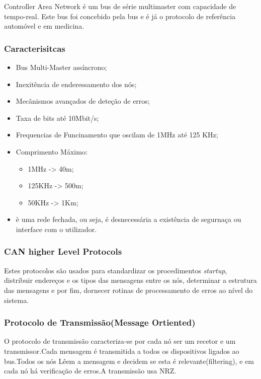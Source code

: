 \documentclass[10pt,a4paper]{paper}
\begin{document}
Controller Area Network é um bus de série multimaster com capacidade de tempo-real. Este bus foi concebido pela bus e é já o protocolo de referência automóvel e em medicina.

\subsubsection*{Caracterisitcas}
\begin{itemize}
 \item Bus Multi-Master assíncrono;
 \item Inexitência de enderessamento dos nós;
 \item Mecânismos avançados de deteção de erros;
 \item Taxa de bits até 10Mbit/s;
 \item Frequencias de Funcinamento que oscilam de 1MHz até 125 KHz;
 \item Comprimento Máximo:
 	\begin{itemize}
 	\item 1MHz -> 40m;
 	\item 125KHz -> 500m;
 	\item 50KHz -> 1Km; 
 	\end{itemize}
 \item è uma rede fechada, ou seja, é desnecessária a existência de segurnaça ou interface com o utilizador.
\end{itemize}

\subsubsection*{CAN higher Level Protocols}

Estes protocolos são usados para standardizar os procedimentos \textit{startup}, distribuir endereços e os tipos das mensagens entre os nós, determinar a estrutura das mensagens e por fim, dornecer rotinas de processamento de erros ao nível do sistema.

\subsubsection*{Protocolo de Transmissão(Message Ortiented)}

O protocolo de transmissão caracteriza-se por cada nó ser um recetor e um transmissor.Cada mensagem é transmitida a todos os dispositivos ligados ao bus.Todos os nós Lêem a mensagem e decidem se esta é relevante(filtering), e em cada nó há verificação de erros.A transmissão usa NRZ.
\end{document}
